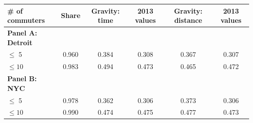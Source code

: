 \begin{tabular}{lccccc}
\toprule \noalign{\smallskip}\# of commuters & Share & Gravity: time & 2013 values & Gravity: distance & 2013 values\\
\midrule
\textbf{Panel A: Detroit}\\
\noalign{\smallskip} \noalign{\smallskip}$\leq$ 5 & 0.960 & 0.384 & 0.308 & 0.367 & 0.307\\
$\leq 10$ & 0.983 & 0.494 & 0.473 & 0.465 & 0.472\\
\textbf{Panel B: NYC}\\
\noalign{\smallskip} \noalign{\smallskip}$\leq$ 5 & 0.978 & 0.362 & 0.306 & 0.373 & 0.306\\
$\leq 10$ & 0.990 & 0.474 & 0.475 & 0.477 & 0.473\\
\bottomrule
\end{tabular}
